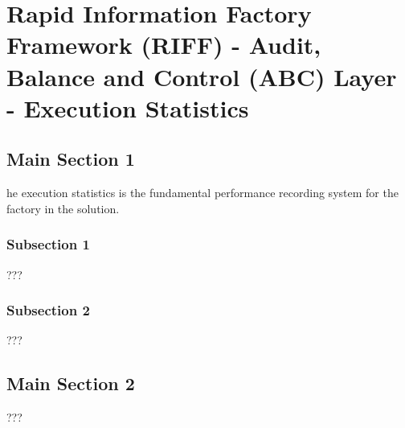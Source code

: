 
\chapter{Rapid Information Factory Framework (RIFF) - Audit, Balance and Control (ABC) Layer - Execution Statistics} %

\label{Chapter29} %



\section{Main Section 1}

he execution statistics is the fundamental performance recording system for the factory in the solution.

\subsection{Subsection 1}

???


\subsection{Subsection 2}

???


\section{Main Section 2}

???
